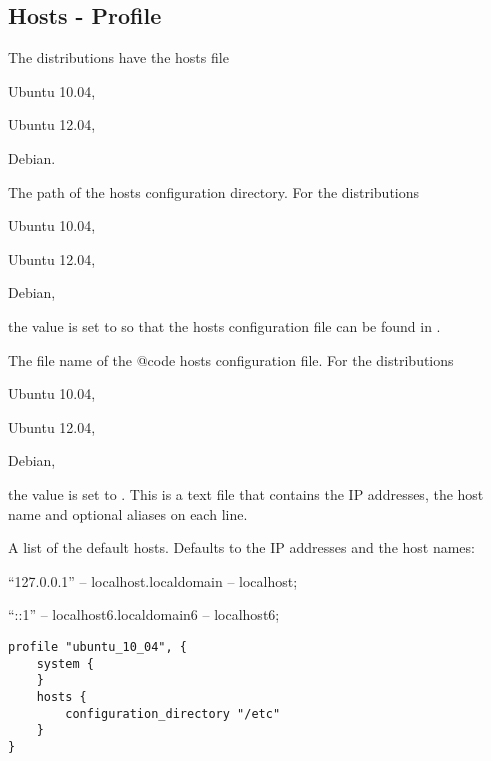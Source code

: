\subsection{Hosts - Profile}

The distributions have the hosts file
\begin{compactitem}
\item[\TheDistribution{ubuntu}] Ubuntu 10.04,
\item[\TheDistribution{ubuntu}] Ubuntu 12.04,
\item[\TheDistribution{debian}] Debian.
\end{compactitem}


The path of the hosts configuration directory.
For the distributions 
\begin{inparaitem}
\item[\TheDistribution{ubuntu}] Ubuntu 10.04,
\item[\TheDistribution{ubuntu}] Ubuntu 12.04,
\item[\TheDistribution{debian}] Debian,
\end{inparaitem}
the value is set to  so that the hosts configuration 
file can be found in .


The file name of the {@code hosts} configuration file.
For the distributions 
\begin{inparaitem}
\item[\TheDistribution{ubuntu}] Ubuntu 10.04,
\item[\TheDistribution{ubuntu}] Ubuntu 12.04,
\item[\TheDistribution{debian}] Debian,
\end{inparaitem}
the value is set to . This is a text file that contains 
the IP addresses, the host name and optional aliases on each line.


A list of the default hosts.
Defaults to the IP addresses and the host names:
\begin{compactitem}
\item ``127.0.0.1'' -- localhost.localdomain -- localhost;
\item ``::1'' -- localhost6.localdomain6 -- localhost6;
\end{compactitem}

\begin{lstlisting}[style=Sscontrol,
label={lst:hosts_ubuntu_profile},
title={Ubuntu hostname profile.}]
profile "ubuntu_10_04", {
    system {
    }
    hosts {
        configuration_directory "/etc"
    }
}
\end{lstlisting}

